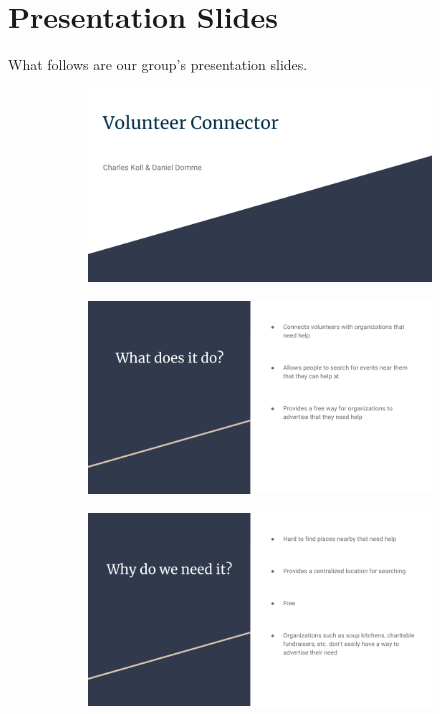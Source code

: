 \documentclass[12pt]{article}
\begin{document}
\section{Presentation Slides}
What follows are our group's presentation slides.
\begin{figure}
  \centering
  \begin{subfigure}[b]{0.7\linewidth}
    \includegraphics[width=\linewidth]{slide1}
  \end{subfigure}
  \begin{subfigure}[b]{0.7\linewidth}
    \includegraphics[width=\linewidth]{slide2}
  \end{subfigure}
  \begin{subfigure}[b]{0.7\linewidth}
    \includegraphics[width=\linewidth]{slide3}
  \end{subfigure}
\end{figure}
\clearpage





\end{document}

